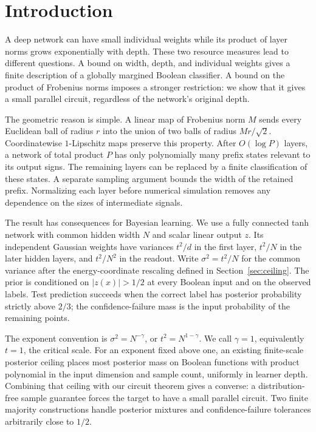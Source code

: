 \documentclass[11pt]{article}
\theoremstyle{remark}
\begin{document}
\section{Introduction}

A deep network can have small individual weights while its product of
layer norms grows exponentially with depth. These two resource measures
lead to different questions. A bound on width, depth, and individual
weights gives a finite description of a globally margined Boolean
classifier. A bound on the product of Frobenius norms imposes a stronger
restriction: we show that it gives a small parallel circuit, regardless
of the network's original depth.

The geometric reason is simple. A linear map of Frobenius norm $M$
sends every Euclidean ball of radius $r$ into the union of two balls of
radius $Mr/\sqrt2$. Coordinatewise $1$-Lipschitz maps preserve this
property. After $O(\log P)$ layers, a network of total product $P$ has
only polynomially many prefix states relevant to its output signs.
The remaining layers can be replaced by a finite classification of
these states. A separate sampling argument bounds the width of the
retained prefix. Normalizing each layer before numerical simulation
removes any dependence on the sizes of intermediate signals.

The result has consequences for Bayesian learning. We use a fully
connected tanh network with common hidden width $N$ and scalar linear
output $z$. Its independent Gaussian weights have variances $t^2/d$ in
the first layer, $t^2/N$ in the later hidden layers, and $t^2/N^2$ in
the readout. Write $\sigma^2=t^2/N$ for the common variance after the
energy-coordinate rescaling defined in Section~\ref{sec:ceiling}.
The prior is conditioned on $|z(x)|>1/2$ at every Boolean input and on
the observed labels. Test prediction succeeds when the correct label
has posterior probability strictly above $2/3$; the confidence-failure
mass is the input probability of the remaining points.

The exponent convention is $\sigma^2=N^{-\gamma}$, or
$t^2=N^{1-\gamma}$. We call $\gamma=1$, equivalently $t=1$, the
critical scale. For an exponent fixed above one, an existing finite-scale posterior ceiling
places most posterior mass on Boolean functions with product polynomial
in the input dimension and sample count, uniformly in learner depth.
Combining that ceiling with our circuit theorem gives a converse: a
distribution-free sample guarantee forces the target to have a small
parallel circuit. Two finite majority constructions handle posterior
mixtures and confidence-failure tolerances arbitrarily close to $1/2$.
\end{document}
